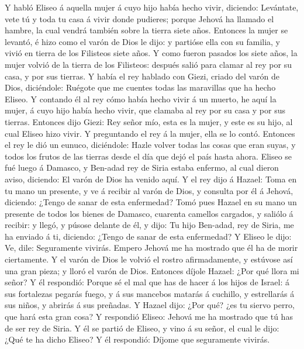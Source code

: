  Y habló Eliseo á aquella mujer á cuyo hijo había hecho
vivir, diciendo: Levántate, vete tú y toda tu casa á vivir donde
pudieres; porque Jehová ha llamado el hambre, la cual vendrá también
sobre la tierra siete años.  Entonces la mujer se levantó,
é hizo como el varón de Dios le dijo: y partióse ella con su familia, y
vivió en tierra de los Filisteos siete años.  Y como
fueron pasados los siete años, la mujer volvió de la tierra de los
Filisteos: después salió para clamar al rey por su casa, y por sus
tierras.  Y había el rey hablado con Giezi, criado del
varón de Dios, diciéndole: Ruégote que me cuentes todas las maravillas
que ha hecho Eliseo.  Y contando él al rey cómo había
hecho vivir á un muerto, he aquí la mujer, á cuyo hijo había hecho
vivir, que clamaba al rey por su casa y por sus tierras. Entonces dijo
Giezi: Rey señor mío, esta es la mujer, y este es su hijo, al cual
Eliseo hizo vivir.  Y preguntando el rey á la mujer, ella
se lo contó. Entonces el rey le dió un eunuco, diciéndole: Hazle volver
todas las cosas que eran suyas, y todos los frutos de las tierras desde
el día que dejó el país hasta ahora.  Eliseo se fué luego
á Damasco, y Ben-adad rey de Siria estaba enfermo, al cual dieron aviso,
diciendo: El varón de Dios ha venido aquí.  Y el rey dijo
á Hazael: Toma en tu mano un presente, y ve á recibir al varón de Dios,
y consulta por él á Jehová, diciendo: ¿Tengo de sanar de esta
enfermedad?  Tomó pues Hazael en su mano un presente de
todos los bienes de Damasco, cuarenta camellos cargados, y saliólo á
recibir: y llegó, y púsose delante de él, y dijo: Tu hijo Ben-adad, rey
de Siria, me ha enviado á ti, diciendo: ¿Tengo de sanar de esta
enfermedad?  Y Eliseo le dijo: Ve, dile: Seguramente
vivirás. Empero Jehová me ha mostrado que él ha de morir ciertamente.
 Y el varón de Dios le volvió el rostro afirmadamente, y
estúvose así una gran pieza; y lloró el varón de Dios. 
Entonces díjole Hazael: ¿Por qué llora mi señor? Y él respondió: Porque
sé el mal que has de hacer á los hijos de Israel: á sus fortalezas
pegarás fuego, y á sus mancebos matarás á cuchillo, y estrellarás á sus
niños, y abrirás á sus preñadas.  Y Hazael dijo: ¿Por
qué? ¿es tu siervo perro, que hará esta gran cosa? Y respondió Eliseo:
Jehová me ha mostrado que tú has de ser rey de Siria.  Y
él se partió de Eliseo, y vino á su señor, el cual le dijo: ¿Qué te ha
dicho Eliseo? Y él respondió: Díjome que seguramente vivirás.
